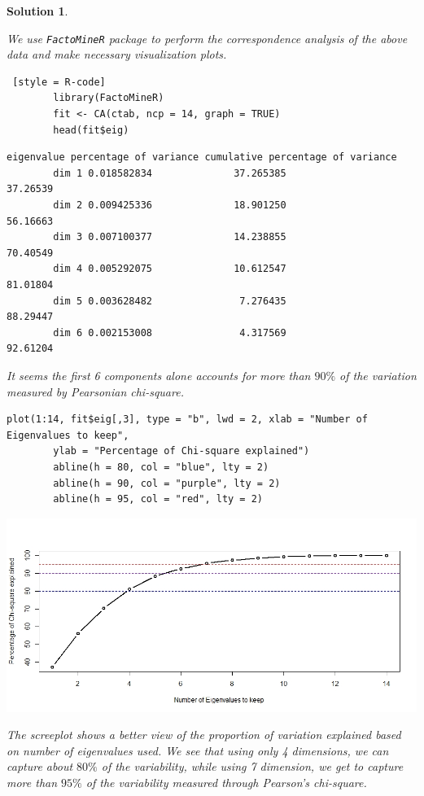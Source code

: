 \documentclass[12pt]{article}
\theoremstyle{problemstyle}
\newtheorem*{solution*}{Solution}
\begin{document}
\begin{solution*}
\begin{enumerate}
	We use \texttt{FactoMineR} package to perform the correspondence analysis of the above data and make necessary visualization plots.
	
	\begin{lstlisting} [style = R-code]
		library(FactoMineR)
		fit <- CA(ctab, ncp = 14, graph = TRUE)
		head(fit$eig)
	\end{lstlisting}
	
	\begin{lstlisting}[style = R-output]
		       eigenvalue percentage of variance cumulative percentage of variance
		dim 1 0.018582834              37.265385                          37.26539
		dim 2 0.009425336              18.901250                          56.16663
		dim 3 0.007100377              14.238855                          70.40549
		dim 4 0.005292075              10.612547                          81.01804
		dim 5 0.003628482               7.276435                          88.29447
		dim 6 0.002153008               4.317569                          92.61204
	\end{lstlisting}
	
	It seems the first 6 components alone accounts for more than $90\%$ of the variation measured by Pearsonian chi-square.
	
	\begin{lstlisting}[style = R-code]
		plot(1:14, fit$eig[,3], type = "b", lwd = 2, xlab = "Number of Eigenvalues to keep", 
		ylab = "Percentage of Chi-square explained")
		abline(h = 80, col = "blue", lty = 2)
		abline(h = 90, col = "purple", lty = 2)
		abline(h = 95, col = "red", lty = 2)
	\end{lstlisting} 
	
	\begin{center}
		\includegraphics[width=\linewidth]{screeplot.jpeg}
	\end{center}

	The screeplot shows a better view of the proportion of variation explained based on number of eigenvalues used. We see that using only 4 dimensions, we can capture about $80\%$ of the variability, while using 7 dimension, we get to capture more than $95\%$ of the variability measured through Pearson's chi-square.
	

\end{enumerate}
\end{solution*}
\end{document}
